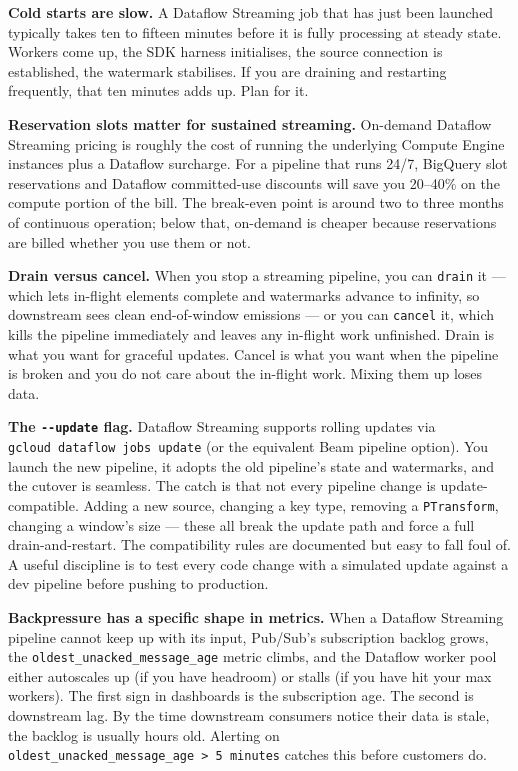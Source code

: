 \documentclass[
  11pt,
  british,
  oneside]{book}
\begin{document}
\textbf{Cold starts are slow.} A Dataflow
Streaming job that has just been launched typically takes ten to fifteen
minutes before it is fully processing at steady state. Workers come up,
the SDK harness initialises, the source connection is established, the
watermark stabilises. If you are draining and restarting frequently,
that ten minutes adds up. Plan for it.

\textbf{Reservation slots matter for sustained streaming.} On-demand
Dataflow Streaming pricing is roughly the cost of running the underlying
Compute Engine instances plus a Dataflow surcharge. For a pipeline that
runs 24/7, BigQuery slot reservations and Dataflow committed-use
discounts will save you 20--40\% on the compute portion of the bill. The
break-even point is around two to three months of continuous operation;
below that, on-demand is cheaper because reservations are billed whether
you use them or not.

\textbf{Drain versus cancel.} When you stop a streaming pipeline, you
can \texttt{drain} it --- which lets in-flight elements complete and
watermarks advance to infinity, so downstream sees clean end-of-window
emissions --- or you can \texttt{cancel} it, which kills the pipeline
immediately and leaves any in-flight work unfinished. Drain is what you
want for graceful updates. Cancel is what you want when the pipeline is
broken and you do not care about the in-flight work. Mixing them up
loses data.

\textbf{The \texttt{-\/-update} flag.} Dataflow Streaming supports
rolling updates via \texttt{gcloud\ dataflow\ jobs\ update} (or the
equivalent Beam pipeline option). You launch the new pipeline, it adopts
the old pipeline's state and watermarks, and the cutover is seamless.
The catch is that not every pipeline change is update-compatible. Adding
a new source, changing a key type, removing a \texttt{PTransform},
changing a window's size --- these all break the update path and force a
full drain-and-restart. The compatibility rules are documented but easy
to fall foul of. A useful discipline is to test every code change with a
simulated update against a dev pipeline before pushing to production.

\textbf{Backpressure has a specific shape in metrics.} When a Dataflow
Streaming pipeline cannot keep up with its input, Pub/Sub's subscription
backlog grows, the \texttt{oldest\_unacked\_message\_age} metric climbs,
and the Dataflow worker pool either autoscales up (if you have headroom)
or stalls (if you have hit your max workers). The first sign in
dashboards is the subscription age. The second is downstream lag. By the
time downstream consumers notice their data is stale, the backlog is
usually hours old. Alerting on
\texttt{oldest\_unacked\_message\_age\ \textgreater{}\ 5\ minutes}
catches this before customers do.
\end{document}
